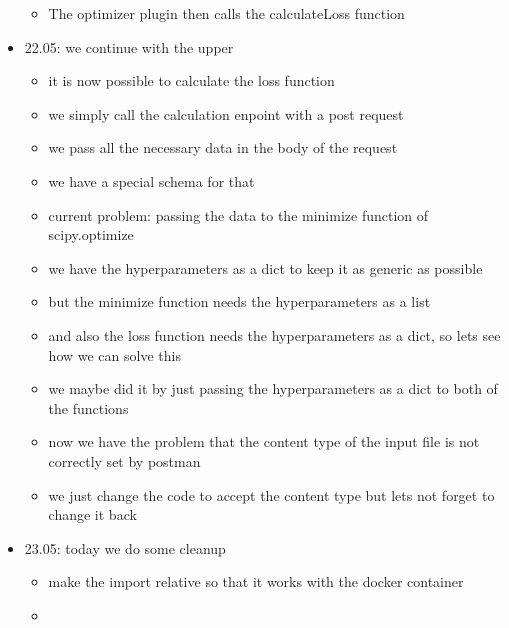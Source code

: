 \documentclass[
  a4paper,  %
  twoside,  %
  bibliography=totoc,
  headsepline,
  cleardoublepage=empty,
  parskip=half,
  draft=false
]{scrbook}
\begin{document}
\begin{itemize}
\begin{itemize}
    \item The optimizer plugin then calls the calculateLoss function
  \end{itemize}
  \item 22.05: we continue with the upper
  \begin{itemize}
    \item it is now possible to calculate the loss function
    \item we simply call the calculation enpoint with a post request
    \item we pass all the necessary data in the body of the request
    \item we have a special schema for that
    \item current problem: passing the data to the minimize function of scipy.optimize
    \item we have the hyperparameters as a dict to keep it as generic as possible
    \item but the minimize function needs the hyperparameters as a list
    \item and also the loss function needs the hyperparameters as a dict, so lets see how we can solve this
    \item we maybe did it by just passing the hyperparameters as a dict to both of the functions 
    \item now we have the problem that the content type of the input file is not correctly set by postman
    \item we just change the code to accept the content type but lets not forget to change it back
  \end{itemize}
  \item 23.05: today we do some cleanup
  \begin{itemize}
    \item make the import relative so that it works with the docker container
    \item 
  \end{itemize}
\end{itemize}
\end{document}
